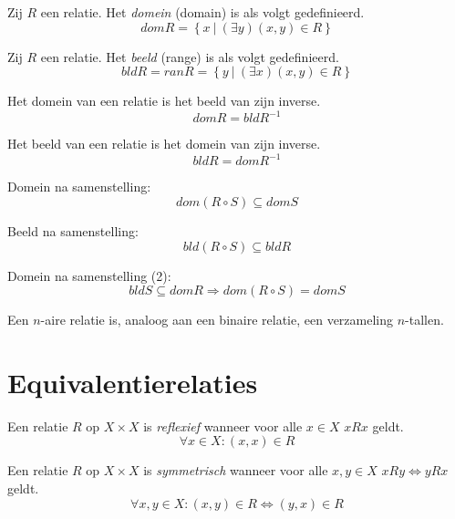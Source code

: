 \documentclass[main.tex]{subfiles}
\begin{document}
\begin{de}
  Zij $R$ een relatie. Het \emph{domein} (domain) is als volgt gedefinieerd.
  \[ dom R = \left\{ x \ |\ (\exists y)(x,y) \in R \right\} \]
\end{de}

\begin{de}
  Zij $R$ een relatie. Het \emph{beeld} (range) is als volgt gedefinieerd.
  \[ bld  R = ran R = \left\{ y \ |\ (\exists x)(x,y) \in R \right\} \]
\end{de}

\begin{st}
  Het domein van een relatie is het beeld van zijn inverse.
  \[ dom R = bld R^{-1} \]
\end{st}

\begin{st}
  Het beeld van een relatie is het domein van zijn inverse.
  \[ bld R = dom R^{-1} \]
\end{st}

\begin{st}
  Domein na samenstelling:
  \[ dom (R \circ S) \subseteq dom S \]
\end{st}
 
\begin{st}
  Beeld na samenstelling:
  \[ bld (R \circ S) \subseteq bld R \]
\end{st}

\begin{st}
  Domein na samenstelling (2):
  \[ bld S \subseteq dom R \Rightarrow dom(R \circ S) = dom S \]
\end{st}

\begin{de}
  Een $n$-aire relatie is, analoog aan een binaire relatie, een verzameling $n$-tallen.
\end{de}

\section{Equivalentierelaties}
\label{sec:equivalentierelaties}

\begin{de}
  \label{de:reflexief}
  Een relatie $R$ op $X \times X$ is \emph{reflexief} wanneer voor alle $x\in X$ $xRx$ geldt.
  \[ \forall x \in X: (x,x) \in R \]
\end{de}

\begin{de}
  \label{de:symmetrisch}
  Een relatie $R$ op $X \times X$ is \emph{symmetrisch} wanneer voor alle $x,y\in X$ $xRy \Leftrightarrow yRx$ geldt.
  \[ \forall x,y \in X: (x,y) \in R \Leftrightarrow (y,x) \in R\]
\end{de}
\end{document}
